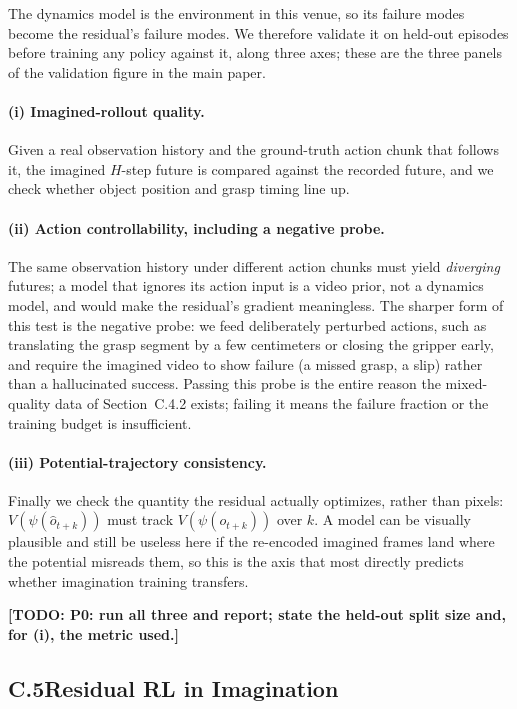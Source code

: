 \documentclass[letterpaper]{article} %
\newcommand{\todo}[1]{\textbf{[TODO: #1]}}
\begin{document}
The dynamics model is the environment in this venue, so its failure modes become
the residual's failure modes. We therefore validate it on held-out episodes
before training any policy against it, along three axes; these are the three
panels of the validation figure in the main paper.

\paragraph{(i) Imagined-rollout quality.}
Given a real observation history and the ground-truth action chunk that follows
it, the imagined $H$-step future is compared against the recorded future, and we check whether
object position and grasp timing line up.

\paragraph{(ii) Action controllability, including a negative probe.}
The same observation history under different action chunks must yield
\emph{diverging} futures; a model that ignores its action input is a video prior,
not a dynamics model, and would make the residual's gradient meaningless. The
sharper form of this test is the negative probe: we feed deliberately perturbed
actions, such as translating the grasp segment by a few centimeters or closing the gripper
early, and require the imagined video to show failure (a missed grasp, a slip)
rather than a hallucinated success. Passing this probe is the entire reason the
mixed-quality data of Section~C.4.2 exists; failing it means the failure fraction
or the training budget is insufficient.

\paragraph{(iii) Potential-trajectory consistency.}
Finally we check the quantity the residual actually optimizes, rather than
pixels: $V(\psi(\hat{o}_{t+k}))$ must track $V(\psi(o_{t+k}))$ over $k$. A model
can be visually plausible and still be useless here if the re-encoded imagined
frames land where the potential misreads them, so this is the axis that most
directly predicts whether imagination training transfers.

\todo{P0: run all three and report; state the held-out split size and, for (i),
the metric used.}

\subsection{C.5\quad Residual RL in Imagination}
\end{document}
